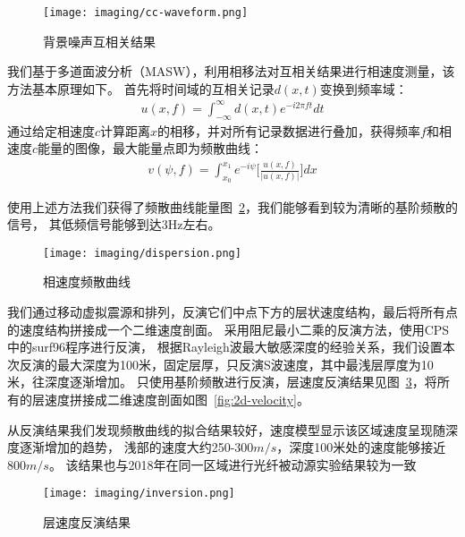 \begin{figure}[h]
    \centering
    \texttt{[image: imaging/cc-waveform.png]}
    \caption{背景噪声互相关结果}
    \label{fig:cc-waveform}
\end{figure}


我们基于多道面波分析（MASW），利用相移法对互相关结果进行相速度测量，该方法基本原理如下。
首先将时间域的互相关记录$d(x,t)$变换到频率域：
\begin{align}
    u(x,f) =   \int\nolimits_{-\infty}^{\infty} d(x,t) e^{-i2\pi ft} dt
    \label{equ:fft}
\end{align}
通过给定相速度$c$计算距离$x$的相移，并对所有记录数据进行叠加，获得频率$f$和相速度$c$能量的图像，最大能量点即为频散曲线：
\begin{align}
    v(\psi ,f) =   \int\nolimits_{x_0}^{x_1}  e^{-i\psi } \bigl[ \frac{u(x,f)}{|u(x,f)|}   \bigl] dx
    \label{equ:c-dispersion}
\end{align}

使用上述方法我们获得了频散曲线能量图~\ref{fig:dispersion}，我们能够看到较为清晰的基阶频散的信号，
其低频信号能够到达3Hz左右。


\begin{figure}[h]
    \centering
    \texttt{[image: imaging/dispersion.png]}
    \caption{相速度频散曲线}
    \label{fig:dispersion}
\end{figure}


我们通过移动虚拟震源和排列，反演它们中点下方的层状速度结构，最后将所有点的速度结构拼接成一个二维速度剖面。
采用阻尼最小二乘的反演方法，使用CPS\citep{herrmann2002computer}中的surf96程序进行反演，
根据Rayleigh波最大敏感深度的经验关系，我们设置本次反演的最大深度为100米，固定层厚，只反演S波速度，其中最浅层厚度为10米，往深度逐渐增加。
只使用基阶频散进行反演，层速度反演结果见图~\ref{fig:inversion}，将所有的层速度拼接成二维速度剖面如图~\ref{fig:2d-velocity}。

从反演结果我们发现频散曲线的拟合结果较好，速度模型显示该区域速度呈现随深度逐渐增加的趋势，
浅部的速度大约250-300$m/s$，深度100米处的速度能够接近800$m/s$。
该结果也与2018年在同一区域进行光纤被动源实验结果较为一致~\citep{林融冰2020}


\begin{figure}[h]
    \centering
    \texttt{[image: imaging/inversion.png]}
    \caption{层速度反演结果}
    \label{fig:inversion}
\end{figure}

